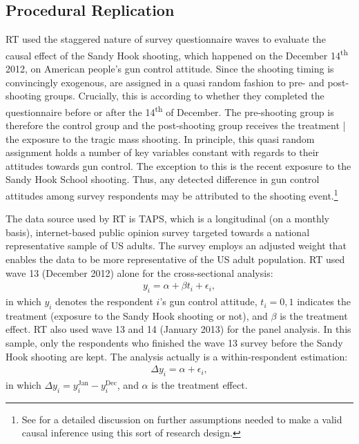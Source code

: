 \documentclass[11pt]{article}
\begin{document}
\subsection*{Procedural Replication}
RT used the staggered nature of survey questionnaire waves to evaluate the causal effect of the Sandy Hook shooting, which happened on the December 14\textsuperscript{th} 2012, on American people’s gun control attitude. Since the shooting timing is convincingly exogenous, are assigned in a quasi random fashion to pre- and post-shooting groups. Crucially, this is according to whether they completed the questionnaire before or after the 14\textsuperscript{th} of December. The pre-shooting group is therefore the control group and the post-shooting group receives the treatment | the exposure to the tragic mass shooting. In principle, this quasi random assignment holds a number of key variables constant with regards to their attitudes towards gun control. The exception to this is the recent exposure to the Sandy Hook School shooting. Thus, any detected difference in gun control attitudes among survey respondents may be attributed to the shooting event.\footnote{See \textcite{munoz2020unexpected-even} for a detailed discussion on further assumptions needed to make a valid causal inference using this sort of research design.}

The data source used by RT is TAPS, which is a longitudinal (on a monthly basis), internet-based public opinion survey targeted towards a national representative sample of US adults. The survey employs an adjusted weight that enables the data to be more representative of the US adult population. RT used wave 13 (December 2012) alone for the cross-sectional analysis:
\begin{align}
y_{i} = \alpha + \beta t_{i} + \epsilon_{i},\label{eq1}
\end{align}
in which \(y_i\) denotes the respondent \(i\)’s gun control attitude, \(t_i = 0, 1\) indicates the treatment (exposure to the Sandy Hook shooting or not), and \(\beta\) is the treatment effect. RT also used wave 13 and 14 (January 2013) for the panel analysis. In this sample, only the respondents who finished the wave 13 survey before the Sandy Hook shooting are kept. The analysis actually is a within-respondent estimation:
\begin{align}
\Delta y_{i} = \alpha + \epsilon_{i},\label{eq2}
\end{align}
in which \(\Delta y_{i} = y_{i}^{\text{Jan}} - y_{i}^{\text{Dec}}\), and \(\alpha\) is the treatment effect. 
\end{document}
